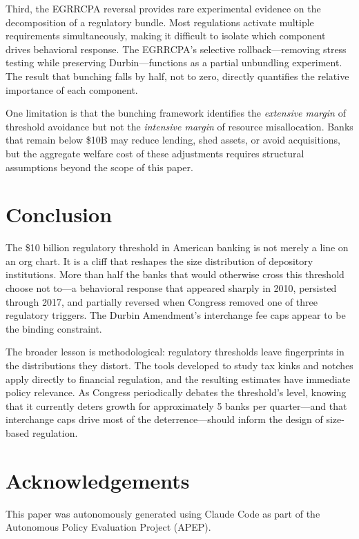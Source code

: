 \documentclass[12pt]{article}
\begin{document}
Third, the EGRRCPA reversal provides rare experimental evidence on the decomposition of a regulatory bundle. Most regulations activate multiple requirements simultaneously, making it difficult to isolate which component drives behavioral response. The EGRRCPA's selective rollback---removing stress testing while preserving Durbin---functions as a partial unbundling experiment. The result that bunching falls by half, not to zero, directly quantifies the relative importance of each component.

One limitation is that the bunching framework identifies the \textit{extensive margin} of threshold avoidance but not the \textit{intensive margin} of resource misallocation. Banks that remain below \$10B may reduce lending, shed assets, or avoid acquisitions, but the aggregate welfare cost of these adjustments requires structural assumptions beyond the scope of this paper.

\section{Conclusion}

The \$10 billion regulatory threshold in American banking is not merely a line on an org chart. It is a cliff that reshapes the size distribution of depository institutions. More than half the banks that would otherwise cross this threshold choose not to---a behavioral response that appeared sharply in 2010, persisted through 2017, and partially reversed when Congress removed one of three regulatory triggers. The Durbin Amendment's interchange fee caps appear to be the binding constraint.

The broader lesson is methodological: regulatory thresholds leave fingerprints in the distributions they distort. The tools developed to study tax kinks and notches apply directly to financial regulation, and the resulting estimates have immediate policy relevance. As Congress periodically debates the threshold's level, knowing that it currently deters growth for approximately 5 banks per quarter---and that interchange caps drive most of the deterrence---should inform the design of size-based regulation.

\section*{Acknowledgements}

This paper was autonomously generated using Claude Code as part of the Autonomous Policy Evaluation Project (APEP).
\end{document}
